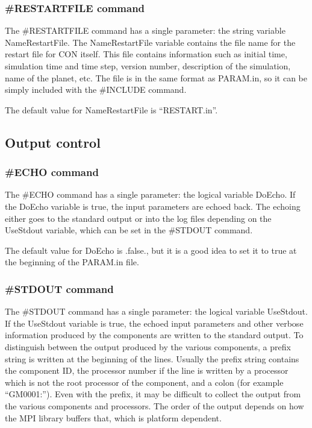 \subsubsection{\#RESTARTFILE command}

The \#RESTARTFILE command has a single parameter: the string variable
NameRestartFile. The NameRestartFile variable contains the file name
for the restart file for CON itself. This file contains information
such as initial time, simulation time and time step, version number,
description of the simulation, name of the planet, etc. The file
is in the same format as PARAM.in, so it can be simply included
with the \#INCLUDE command. 

The default value for NameRestartFile is ``RESTART.in''.

\subsection{Output control}

\subsubsection{\#ECHO command}

The \#ECHO command has a single parameter: the logical variable DoEcho.
If the DoEcho variable is true, the input parameters are echoed back.
The echoing either goes to the standard output or into the log files
depending on the UseStdout variable, which can be set in the
\#STDOUT command.

The default value for DoEcho is .false., but it is a good idea to
set it to true at the beginning of the PARAM.in file.

\subsubsection{\#STDOUT command}

The \#STDOUT command has a single parameter: the logical variable UseStdout.
If the UseStdout variable is true, the echoed input parameters and other
verbose information produced by the components are written to the
standard output. To distinguish between the output produced by the
various components, a prefix string is written at the beginning 
of the lines. Usually the prefix string contains the component ID, the
processor number if the line is written by a processor which 
is not the root processor of the component, and a colon (for example
``GM0001:'').
Even with the prefix, it may be difficult to collect the output
from the various components and processors. The order of the output
depends on how the MPI library buffers that, which is platform
dependent. 


